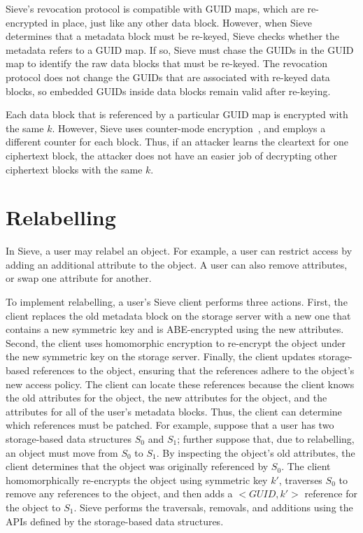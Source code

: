 Sieve's revocation protocol
is compatible with GUID maps, which are re-encrypted
in place, just like any other data block. However,
when Sieve determines that a metadata block must
be re-keyed, Sieve checks whether the metadata
refers to a GUID map. If so, Sieve must chase
the GUIDs in the GUID map to identify the
raw data blocks that must be re-keyed. The revocation
protocol does not change the GUIDs that are
associated with re-keyed data blocks, so embedded
GUIDs inside data blocks remain valid after
re-keying.

Each data block that is referenced by
a particular GUID map is encrypted with the
same $k$. However, Sieve uses counter-mode
encryption~\cite{ctrmode}, and employs a
different counter for each block.
Thus, if an attacker learns the cleartext
for one ciphertext block, the attacker does
not have an easier job of decrypting other
ciphertext blocks with the same $k$.

\section{Relabelling}
\label{sec:relabel}

In Sieve, a user may relabel an object. For
example, a user can restrict access by adding
an additional attribute to the object. A user
can also remove attributes, or swap one
attribute for another.

To implement relabelling, a user's Sieve
client performs three actions. First,
the client replaces the old
metadata block on the storage server with a new one 
that contains a new symmetric key 
and is ABE-encrypted using the new attributes.
Second, the client uses homomorphic encryption to
re-encrypt the object under the new symmetric key 
on the storage server.
Finally, the client updates storage-based
references to the object, ensuring that the
references adhere to the object's new access
policy. The client can locate these references
because the client knows the old attributes
for the object, the new attributes for the
object, and the attributes for all of the user's
metadata blocks. Thus, the client can determine
which references must be patched. For example,
suppose that a user has two storage-based data
structures $S_0$ and $S_1$; further suppose that,
due to relabelling, an object must move from
$S_0$ to $S_1$. By inspecting the object's old
attributes, the client determines that the object
was originally referenced by $S_0$. The client
homomorphically re-encrypts the object using
symmetric key $k'$, traverses $S_0$ to remove
any references to the object, and then adds a
$<GUID, k'>$ reference for the object to $S_1$.
Sieve performs the traversals, removals, and
additions using the APIs defined by the
storage-based data structures.

